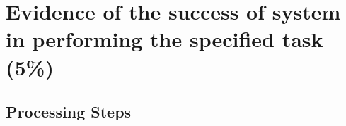 \documentclass[a4paper,12pt]{article}
\begin{document}

\section*{Evidence of the success of system in performing the specified task (5\%)}
\subsection*{Processing Steps}

\end{document}
